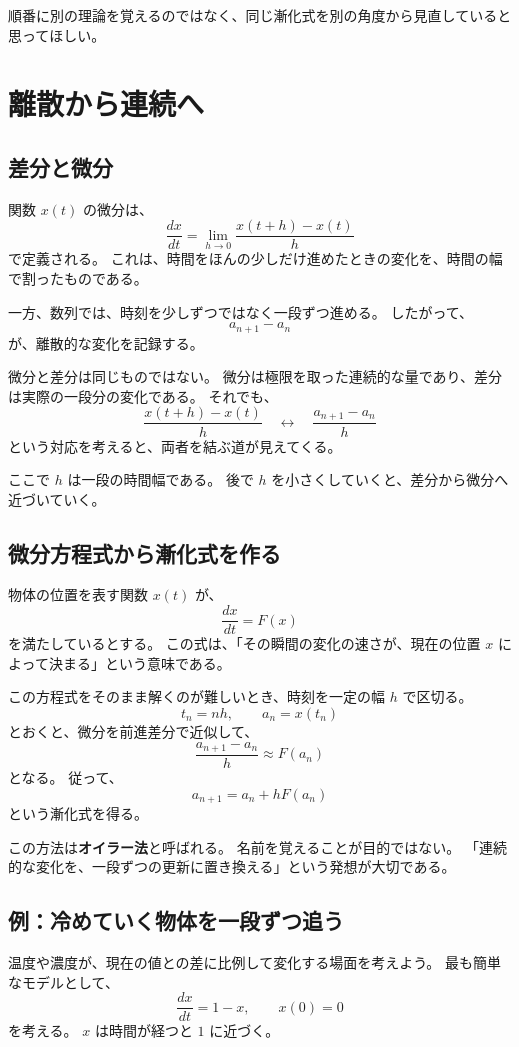 順番に別の理論を覚えるのではなく、同じ漸化式を別の角度から見直していると思ってほしい。

\section{離散から連続へ}

\subsection{差分と微分}

関数 $x(t)$ の微分は、
\[
  \frac{dx}{dt}
  =\lim_{h\to0}\frac{x(t+h)-x(t)}{h}
\]
で定義される。
これは、時間をほんの少しだけ進めたときの変化を、時間の幅で割ったものである。

一方、数列では、時刻を少しずつではなく一段ずつ進める。
したがって、
\[
  a_{n+1}-a_n
\]
が、離散的な変化を記録する。

微分と差分は同じものではない。
微分は極限を取った連続的な量であり、差分は実際の一段分の変化である。
それでも、
\[
  \frac{x(t+h)-x(t)}{h}
  \quad\longleftrightarrow\quad
  \frac{a_{n+1}-a_n}{h}
\]
という対応を考えると、両者を結ぶ道が見えてくる。

ここで $h$ は一段の時間幅である。
後で $h$ を小さくしていくと、差分から微分へ近づいていく。

\subsection{微分方程式から漸化式を作る}

物体の位置を表す関数 $x(t)$ が、
\[
  \frac{dx}{dt}=F(x)
\]
を満たしているとする。
この式は、「その瞬間の変化の速さが、現在の位置 $x$ によって決まる」という意味である。

この方程式をそのまま解くのが難しいとき、時刻を一定の幅 $h$ で区切る。
\[
  t_n=nh,\qquad a_n=x(t_n)
\]
とおくと、微分を前進差分で近似して、
\[
  \frac{a_{n+1}-a_n}{h}\approx F(a_n)
\]
となる。
従って、
\[
  a_{n+1}=a_n+hF(a_n)
\]
という漸化式を得る。

この方法は\textbf{オイラー法}と呼ばれる。
名前を覚えることが目的ではない。
「連続的な変化を、一段ずつの更新に置き換える」という発想が大切である。

\subsection{例：冷めていく物体を一段ずつ追う}

温度や濃度が、現在の値との差に比例して変化する場面を考えよう。
最も簡単なモデルとして、
\[
  \frac{dx}{dt}=1-x,\qquad x(0)=0
\]
を考える。
$x$ は時間が経つと $1$ に近づく。

